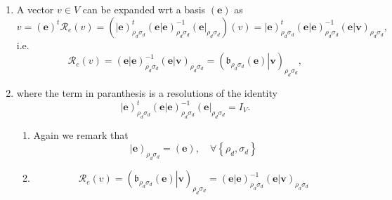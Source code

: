 \documentclass[aps,preprint]{revtex4}
\begin{document}
\begin{enumerate}
\item A vector $v\in V$ can be expanded wrt a basis $\left( \boldsymbol{e}%
\right) $ as 
\begin{equation}
v=\left( \boldsymbol{e}\right) ^{t}\mathcal{R}_{e}\left( v\right) =\left( 
\overset{}{\left\vert \boldsymbol{e}\right) _{\rho _{d}\sigma
_{d}}^{t}\left( \left. \boldsymbol{e}\right\vert \boldsymbol{e}\right)
_{\rho _{d}\sigma _{d}}^{-1}\left( \boldsymbol{e}\right\vert _{\rho
_{d}\sigma _{d}}}\right) \left( v\right) =\left\vert \boldsymbol{e}\right)
_{\rho _{d}\sigma _{d}}^{t}\left( \left. \boldsymbol{e}\right\vert 
\boldsymbol{e}\right) _{\rho _{d}\sigma _{d}}^{-1}\left( \left. \boldsymbol{e%
}\right\vert \boldsymbol{v}\right) _{\rho _{d}\sigma _{d}},
\end{equation}%
i.e. 
\begin{equation}
\mathcal{R}_{e}\left( v\right) =\left( \left. \boldsymbol{e}\right\vert 
\boldsymbol{e}\right) _{\rho _{d}\sigma _{d}}^{-1}\left( \left. \boldsymbol{e%
}\right\vert \boldsymbol{v}\right) _{\rho _{d}\sigma _{d}}=\left( \left. 
\mathfrak{b}_{\rho _{d}\sigma _{d}}\left( \boldsymbol{e}\right) \right\vert 
\boldsymbol{v}\right) _{\rho _{d}\sigma _{d}},
\end{equation}

\item where the term in paranthesis is a resolutions of the identity 
\begin{equation}
\left\vert \boldsymbol{e}\right) _{\rho _{d}\sigma _{d}}^{t}\left( \left. 
\boldsymbol{e}\right\vert \boldsymbol{e}\right) _{\rho _{d}\sigma
_{d}}^{-1}\left( \boldsymbol{e}\right\vert _{\rho _{d}\sigma _{d}}=I_{V}.
\end{equation}

\begin{enumerate}
\item Again we remark that 
\begin{equation}
\left\vert \boldsymbol{e}\right) _{\rho _{d}\sigma _{d}}=\left( \boldsymbol{e%
}\right) ,\quad \forall \left\{ \rho _{d},\sigma _{d}\right\}
\end{equation}

\item 
\begin{equation}
\mathcal{R}_{e}\left( v\right) =\left( \left. \mathfrak{b}_{\rho _{d}\sigma
_{d}}\left( \boldsymbol{e}\right) \right\vert \boldsymbol{v}\right) _{\rho
_{d}\sigma _{d}}=\left( \left. \boldsymbol{e}\right\vert \boldsymbol{e}%
\right) _{\rho _{d}\sigma _{d}}^{-1}\left( \left. \boldsymbol{e}\right\vert 
\boldsymbol{v}\right) _{\rho _{d}\sigma _{d}}
\end{equation}


\end{enumerate}
\end{enumerate}
\end{document}
